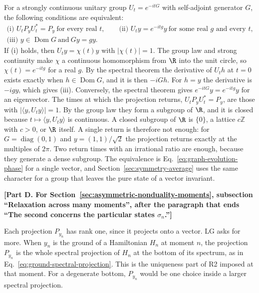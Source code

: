 For a strongly continuous unitary group $U_t=e^{-itG}$ with self-adjoint generator $G$, the following conditions are equivalent:
\begin{equation}
 \begin{gathered}
 \text{(i) }U_tP_yU_t^*=P_y\ \text{for every real }t,\qquad
 \text{(ii) }U_ty=e^{-itg}y\ \text{for some real }g\text{ and every }t,\\
 \text{(iii) }y\in\operatorname{Dom}G\ \text{and}\ Gy=gy .
 \end{gathered}
 \label{eq:relaxation-unitary-group}
\end{equation}
If (i) holds, then $U_ty=\chi(t)y$ with $|\chi(t)|=1$. The group law and strong continuity make $\chi$ a continuous homomorphism from $\R$ into the unit circle, so $\chi(t)=e^{-itg}$ for a real $g$. By the spectral theorem the derivative of $U_th$ at $t=0$ exists exactly when $h\in\operatorname{Dom}G$, and it is then $-iGh$. For $h=y$ the derivative is $-igy$, which gives (iii). Conversely, the spectral theorem gives $e^{-itG}y=e^{-itg}y$ for an eigenvector. The times at which the projection returns, $U_tP_yU_t^*=P_y$, are those with $|\langle y,U_ty\rangle|=1$. By the group law they form a subgroup of $\R$, and it is closed because $t\mapsto\langle y,U_ty\rangle$ is continuous. A closed subgroup of $\R$ is $\{0\}$, a lattice $c\mathbb Z$ with $c>0$, or $\R$ itself. A single return is therefore not enough: for $G=\operatorname{diag}(0,1)$ and $y=(1,1)/\sqrt2$ the projection returns exactly at the multiples of $2\pi$. Two return times with an irrational ratio are enough, because they generate a dense subgroup. The equivalence is Eq.~\eqref{eq:graph-evolution-phase} for a single vector, and Section~\ref{sec:symmetry-average} uses the same character for a group that leaves the pure state of a vector invariant.

\par\medskip\noindent\textbf{[Part D. For Section~\ref{sec:asymmetric-nonduality-moments}, subsection ``Relaxation across many moments'', after the paragraph that ends ``The second concerns the particular states $\sigma_n$.'']}\par\smallskip

Each projection $P_{y_n}$ has rank one, since it projects onto a vector. LG asks for more. When $y_n$ is the ground of a Hamiltonian $H_n$ at moment $n$, the projection $P_{y_n}$ is the whole spectral projection of $H_n$ at the bottom of its spectrum, as in Eq.~\eqref{eq:ground-spectral-projection}. This is the uniqueness part of R2 imposed at that moment. For a degenerate bottom, $P_{y_n}$ would be one choice inside a larger spectral projection.


